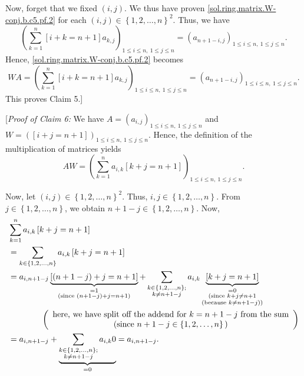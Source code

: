 \documentclass[paper=a4, fontsize=12pt]{scrartcl}%
\let\sumnonlimits\sum
\renewcommand{\sum}{\sumnonlimits\limits}
\theoremstyle{plainsl}
\theoremstyle{definition}
\theoremstyle{remark}
\begin{document}
Now, forget that we fixed $\left(  i,j\right)  $. We thus have proven
\eqref{sol.ring.matrix.W-conj.b.c5.pf.2} for each $\left(  i,j\right)
\in\left\{  1,2,\ldots,n\right\}  ^{2}$. Thus, we have%
\[
\left(  \sum_{k=1}^{n}\left[  i+k=n+1\right]  a_{k,j}\right)  _{1\leq i\leq
n,\ 1\leq j\leq n}=\left(  a_{n+1-i,j}\right)  _{1\leq i\leq n,\ 1\leq j\leq
n}.
\]
Hence, \eqref{sol.ring.matrix.W-conj.b.c5.pf.2} becomes%
\[
WA=\left(  \sum_{k=1}^{n}\left[  i+k=n+1\right]  a_{k,j}\right)  _{1\leq i\leq
n,\ 1\leq j\leq n}=\left(  a_{n+1-i,j}\right)  _{1\leq i\leq n,\ 1\leq j\leq
n}.
\]
This proves Claim 5.]

[\textit{Proof of Claim 6:} We have $A=\left(  a_{i,j}\right)  _{1\leq i\leq
n,\ 1\leq j\leq n}$ and $W=\left(  \left[  i+j=n+1\right]  \right)  _{1\leq
i\leq n,\ 1\leq j\leq n}$. Hence, the definition of the multiplication of
matrices yields%
\begin{equation}
AW=\left(  \sum_{k=1}^{n}a_{i,k}\left[  k+j=n+1\right]  \right)  _{1\leq i\leq
n,\ 1\leq j\leq n}. \label{sol.ring.matrix.W-conj.b.c6.pf.1}%
\end{equation}


Now, let $\left(  i,j\right)  \in\left\{  1,2,\ldots,n\right\}  ^{2}$. Thus,
$i,j\in\left\{  1,2,\ldots,n\right\}  $. From $j\in\left\{  1,2,\ldots
,n\right\}  $, we obtain $n+1-j\in\left\{  1,2,\ldots,n\right\}  $. Now,%
\begin{align}
&  \sum_{k=1}^{n}a_{i,k}\left[  k+j=n+1\right] \nonumber\\
&  =\sum_{k\in\left\{  1,2,\ldots,n\right\}  }a_{i,k}\left[  k+j=n+1\right]
\nonumber\\
&  =a_{i,n+1-j}\underbrace{\left[  \left(  n+1-j\right)  +j=n+1\right]
}_{\substack{=1\\\text{(since }\left(  n+1-j\right)  +j=n+1\text{)}}%
}+\sum_{\substack{k\in\left\{  1,2,\ldots,n\right\}  ;\\k\neq n+1-j}%
}a_{i,k}\underbrace{\left[  k+j=n+1\right]  }_{\substack{=0\\\text{(since
}k+j\neq n+1\\\text{(because }k\neq n+1-j\text{))}}}\nonumber\\
&  \qquad\qquad\left(
\begin{array}
[c]{c}%
\text{here, we have split off the addend for }k=n+1-j\text{ from the sum}\\
\text{(since }n+1-j\in\left\{  1,2,\ldots,n\right\}  \text{)}%
\end{array}
\right) \nonumber\\
&  =a_{i,n+1-j}+\underbrace{\sum_{\substack{k\in\left\{  1,2,\ldots,n\right\}
;\\k\neq n+1-j}}a_{i,k}0}_{=0}=a_{i,n+1-j}.
\label{sol.ring.matrix.W-conj.b.c6.pf.2}%
\end{align}
\end{document}
